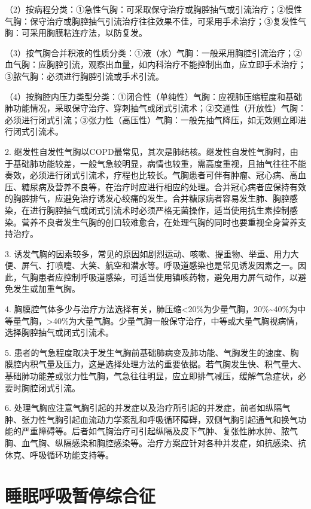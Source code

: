 （2）按病程分类：①急性气胸：可采取保守治疗或胸腔抽气或引流治疗；②慢性气胸：保守治疗或胸腔抽气引流治疗往往效果不佳，可采用手术治疗；③复发性气胸：可采用胸膜粘连疗法，以防复发。

（3）按气胸合并积液的性质分类：①液（水）气胸：一般采用胸腔引流治疗；②血气胸：应胸腔引流，观察出血量，如内科治疗不能控制出血，应立即手术治疗；③脓气胸：必须进行胸腔引流或手术引流。

（4）按胸腔内压力类型分类：①闭合性（单纯性）气胸：应视肺压缩程度和基础肺功能情况，采取保守治疗、穿刺抽气或闭式引流术；②交通性（开放性）气胸：必须进行闭式引流；③张力性（高压性）气胸：一般先抽气降压，如无效则立即进行闭式引流术。

2.
继发性自发性气胸以COPD最常见，其次是肺结核。继发性自发性气胸时，由于基础肺功能较差，一般气急较明显，病情也较重，需高度重视，且抽气往往不能奏效，必须进行闭式引流术，疗程也比较长。气胸患者可伴有肿瘤、冠心病、高血压、糖尿病及营养不良等，在治疗时应进行相应的处理。合并冠心病者应保持有效的胸腔排气，应避免治疗诱发心绞痛的发生。合并糖尿病者容易发生肺、胸腔感染，在进行胸腔抽气或闭式引流术时必须严格无菌操作，适当使用抗生素控制感染。营养不良者发生气胸的创口较难愈合，在处理气胸的同时也要重视全身营养支持治疗。

3.
诱发气胸的因素较多，常见的原因如剧烈运动、咳嗽、提重物、举重、用力大便、屏气、打喷嚏、大笑、航空和潜水等。呼吸道感染也是常见诱发因素之一。因此，气胸患者应控制呼吸道感染，可适当使用镇咳药物，避免用力屏气动作，以避免发生或加重气胸。

4.
胸膜腔气体多少与治疗方法选择有关，肺压缩\textless{}20\%为少量气胸，20\%\textasciitilde{}40\%为中等量气胸，\textgreater{}40\%为大量气胸。少量气胸一般保守治疗，中等或大量气胸视病情，选择胸腔抽气或闭式引流术。

5.
患者的气急程度取决于发生气胸前基础肺病变及肺功能、气胸发生的速度、胸膜腔内积气量及压力，这是选择处理方法的重要依据。若气胸发生快、积气量大、基础肺功能差或张力性气胸，气急往往明显，应立即排气减压，缓解气急症状，必要时胸腔闭式引流。

6.
处理气胸应注意气胸引起的并发症以及治疗所引起的并发症，前者如纵隔气肿、张力性气胸引起血流动力学紊乱和呼吸循环障碍，双侧气胸引起通气和换气功能的严重障碍等。后者如气胸治疗可引起纵隔及皮下气肿、复张性肺水肿、脓气胸、血气胸、纵隔感染和胸腔感染等。治疗方案应针对各种并发症，如抗感染、抗休克、呼吸循环功能支持等。

\section{睡眠呼吸暂停综合征}

